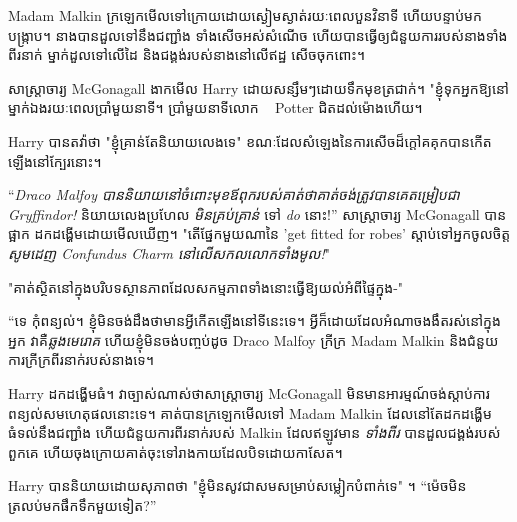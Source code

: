 Madam Malkin ក្រឡេកមើលទៅក្រោយដោយស្ងៀមស្ងាត់រយៈពេលបួនវិនាទី ហើយបន្ទាប់មកបង្ក្រាប។ នាងបានដួលទៅនឹងជញ្ជាំង ទាំងសើចអស់សំណើច ហើយបានធ្វើឲ្យជំនួយការរបស់នាងទាំងពីរនាក់ ម្នាក់ដួលទៅលើដៃ និងជង្គង់របស់នាងនៅលើឥដ្ឋ សើចចុកពោះ។

សាស្ត្រាចារ្យ McGonagall ងាកមើល Harry ដោយសន្សឹមៗដោយទឹកមុខត្រជាក់។ "ខ្ញុំទុកអ្នកឱ្យនៅម្នាក់ឯងរយៈពេលប្រាំមួយនាទី។ ប្រាំមួយនាទីលោក ~ Potter ជិតដល់ម៉ោងហើយ។

Harry បានតវ៉ាថា "ខ្ញុំគ្រាន់តែនិយាយលេងទេ" ខណៈដែលសំឡេងនៃការសើចដ៏ក្ដៅគគុកបានកើតឡើងនៅក្បែរនោះ។

“\emph{Draco Malfoy បាន​និយាយ​នៅ​ចំពោះ​មុខ​ឪពុក​របស់​គាត់​ថា​គាត់​ចង់​ត្រូវ​បាន​គេ​តម្រៀប​ជា Gryffindor!} និយាយ​លេង​ប្រហែល \emph{មិន​គ្រប់​គ្រាន់} ទៅ \emph{do} នោះ!” សាស្រ្តាចារ្យ McGonagall បានផ្អាក ដកដង្ហើមដោយមើលឃើញ។ "តើផ្នែកមួយណានៃ 'get fitted for robes' ស្តាប់ទៅអ្នកចូលចិត្ត\emph{សូមដេញ Confundus Charm នៅលើសកលលោកទាំងមូល!}"

"គាត់ស្ថិតនៅក្នុងបរិបទស្ថានភាពដែលសកម្មភាពទាំងនោះធ្វើឱ្យយល់អំពីផ្ទៃក្នុង-"

“ទេ កុំពន្យល់។ ខ្ញុំមិនចង់ដឹងថាមានអ្វីកើតឡើងនៅទីនេះទេ។ អ្វីក៏ដោយដែលអំណាចងងឹតរស់នៅក្នុងអ្នក វាគឺ\emph{ឆ្លងមេរោគ} ហើយខ្ញុំមិនចង់បញ្ចប់ដូច Draco Malfoy ក្រីក្រ Madam Malkin និងជំនួយការក្រីក្រពីរនាក់របស់នាងទេ។

Harry ដកដង្ហើមធំ។ វាច្បាស់ណាស់ថាសាស្រ្តាចារ្យ McGonagall មិនមានអារម្មណ៍ចង់ស្តាប់ការពន្យល់សមហេតុផលនោះទេ។ គាត់បានក្រឡេកមើលទៅ Madam Malkin ដែលនៅតែដកដង្ហើមធំទល់នឹងជញ្ជាំង ហើយជំនួយការពីរនាក់របស់ Malkin ដែលឥឡូវមាន \emph{ទាំងពីរ} បានដួលជង្គង់របស់ពួកគេ ហើយចុងក្រោយគាត់ចុះទៅរាងកាយដែលបិទដោយកាសែត។

Harry បាននិយាយដោយសុភាពថា "ខ្ញុំមិនសូវជាសមសម្រាប់សម្លៀកបំពាក់ទេ" ។ “ម៉េចមិនត្រលប់មកផឹកទឹកមួយទៀត?”

